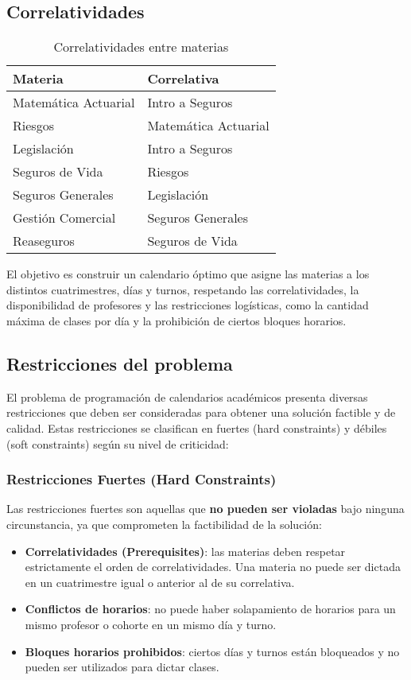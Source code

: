 \subsection*{Correlatividades}
\begin{table}[ht]
\centering
\begin{tabular}{|l|l|}
\hline
	\textbf{Materia} & \textbf{Correlativa} \\
\hline
Matemática Actuarial & Intro a Seguros \\
Riesgos & Matemática Actuarial \\
Legislación & Intro a Seguros \\
Seguros de Vida & Riesgos \\
Seguros Generales & Legislación \\
Gestión Comercial & Seguros Generales \\
Reaseguros & Seguros de Vida \\
\hline
\end{tabular}
\caption{Correlatividades entre materias}
\end{table}

El objetivo es construir un calendario óptimo que asigne las materias a los distintos cuatrimestres, días y turnos, respetando las correlatividades, la disponibilidad de profesores y las restricciones logísticas, como la cantidad máxima de clases por día y la prohibición de ciertos bloques horarios.

\subsection{Restricciones del problema}
El problema de programación de calendarios académicos presenta diversas restricciones que deben ser consideradas para obtener una solución factible y de calidad. Estas restricciones se clasifican en fuertes (hard constraints) y débiles (soft constraints) según su nivel de criticidad:

\subsubsection{Restricciones Fuertes (Hard Constraints)}
Las restricciones fuertes son aquellas que \textbf{no pueden ser violadas} bajo ninguna circunstancia, ya que comprometen la factibilidad de la solución:

\begin{itemize}
    \item \textbf{Correlatividades (Prerequisites)}: las materias deben respetar estrictamente el orden de correlatividades. Una materia no puede ser dictada en un cuatrimestre igual o anterior al de su correlativa.
    \item \textbf{Conflictos de horarios}: no puede haber solapamiento de horarios para un mismo profesor o cohorte en un mismo día y turno.
    \item \textbf{Bloques horarios prohibidos}: ciertos días y turnos están bloqueados y no pueden ser utilizados para dictar clases.
\end{itemize}

